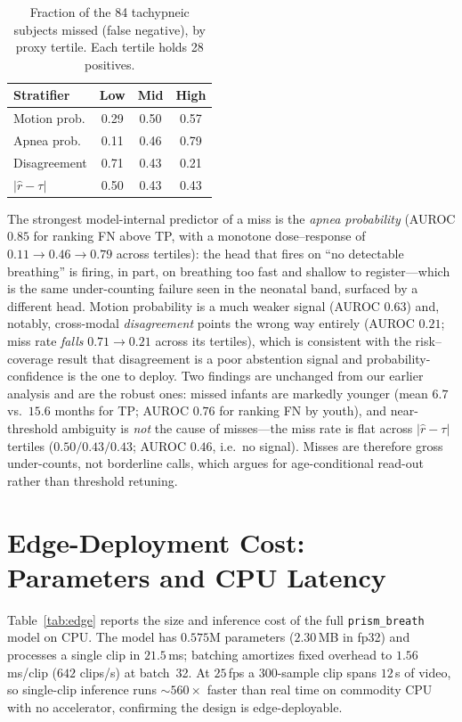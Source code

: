 \begin{table}[!t]
\caption{Fraction of the 84 tachypneic subjects missed (false negative), by proxy tertile. Each
tertile holds 28 positives.}
\label{tab:fail_tertile}\centering\small
\begin{tabular}{@{}lccc@{}}\toprule
Stratifier & Low & Mid & High\\\midrule
Motion prob.      & 0.29 & 0.50 & 0.57 \\
Apnea prob.       & 0.11 & 0.46 & 0.79 \\
Disagreement      & 0.71 & 0.43 & 0.21 \\
$|\hat r-\tau|$   & 0.50 & 0.43 & 0.43 \\\bottomrule
\end{tabular}
\end{table}

\noindent The strongest model-internal predictor of a miss is the \emph{apnea probability}
(AUROC $0.85$ for ranking FN above TP, with a monotone dose--response of
$0.11\!\to\!0.46\!\to\!0.79$ across tertiles): the head that fires on ``no detectable breathing'' is
firing, in part, on breathing too fast and shallow to register---which is the same under-counting
failure seen in the neonatal band, surfaced by a different head. Motion probability is a much weaker
signal (AUROC $0.63$) and, notably, cross-modal \emph{disagreement} points the wrong way entirely
(AUROC $0.21$; miss rate \emph{falls} $0.71\!\to\!0.21$ across its tertiles), which is consistent with
the risk--coverage result that disagreement is a poor abstention signal and probability-confidence is
the one to deploy. Two findings are unchanged from our earlier analysis and are the robust ones: missed
infants are markedly younger (mean $6.7$ vs.\ $15.6$ months for TP; AUROC $0.76$ for ranking FN by
youth), and near-threshold ambiguity is \emph{not} the cause of misses---the miss rate is flat across
$|\hat r-\tau|$ tertiles ($0.50/0.43/0.43$; AUROC $0.46$, i.e.\ no signal). Misses are therefore gross
under-counts, not borderline calls, which argues for age-conditional read-out rather than threshold
retuning.

\section{Edge-Deployment Cost: Parameters and CPU Latency}
\label{sec:edge}
Table~\ref{tab:edge} reports the size and inference cost of the full \texttt{prism\_breath} model on CPU.
The model has $0.575$M parameters ($2.30$\,MB in fp32) and processes a single clip in $21.5$\,ms; batching
amortizes fixed overhead to $1.56$\,ms/clip ($642$ clips/s) at batch~32. At $25$\,fps a $300$-sample clip
spans $12$\,s of video, so single-clip inference runs $\sim\!560\times$ faster than real time on commodity
CPU with no accelerator, confirming the design is edge-deployable.

